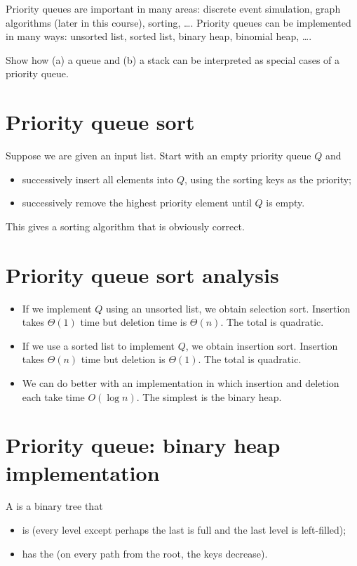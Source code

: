 Priority queues are important in many areas: discrete event simulation, 
graph algorithms (later in this course), sorting, \dots .
Priority queues can be implemented in many ways: unsorted list, sorted 
list, binary heap, binomial heap, \dots . 

\begin{Boxample}[5]
Show how (a) a queue and (b) a stack can be interpreted as special cases of a priority queue.
\end{Boxample}

\section{Priority queue sort}
Suppose we are given an input list. Start with an empty priority queue $Q$
and
\begin{itemize}
\item successively insert all elements into $Q$, using the sorting keys as the 
priority;
\item successively remove the highest priority element until $Q$ is empty. 
\end{itemize}
This gives a sorting algorithm that is obviously correct. 

\section{Priority queue sort analysis}
\begin{itemize}
\item If we implement $Q$ using an unsorted list, we obtain selection sort. 
Insertion takes $\Theta(1)$ time but deletion time is $\Theta(n)$. The total is quadratic.
\item If we use a sorted list to implement $Q$, we obtain insertion sort. 
Insertion takes $\Theta(n)$ time but deletion is $\Theta(1)$. The total is quadratic.
\item We can do better with an implementation in which insertion and deletion 
each take time $O(\log n)$. The simplest is the binary heap.
\end{itemize}

\section{Priority queue: binary heap implementation}
\begin{Definition}
A  is a binary tree that 
\begin{itemize}
\item is  (every level except perhaps the last is full and 
the last level is left-filled);
\item has the  (on every path from the root, the keys decrease). 
\end{itemize}
\end{Definition}

